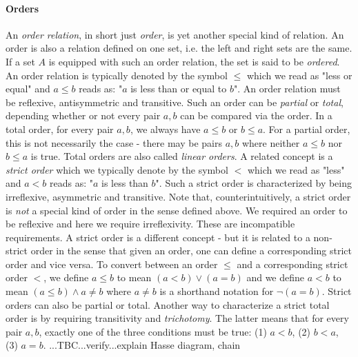 \paragraph{Orders} \label{Par:Orders} An \emph{order relation}, in short just \emph{order}, is yet another special kind of relation. An order is also a relation defined on one set, i.e. the left and right sets are the same. If a set $A$ is equipped with such an order relation, the set is said to be \emph{ordered}. An order relation is typically denoted by the symbol $\leq$ which we read as "less or equal" and $a \leq b$ reads as: "$a$ is less than or equal to $b$". An order relation must be reflexive, antisymmetric and transitive. Such an order can be \emph{partial} or \emph{total}, depending whether or not every pair $a,b$ can be compared via the order. In a total order, for every pair $a,b$, we always have $a \leq b$ or $b \leq a$. For a partial order, this is not necessarily the case - there may be pairs $a,b$ where neither $a \leq b$ nor $b \leq a$ is true. Total orders are also called \emph{linear orders}. A related concept is a \emph{strict order} which we typically denote by the symbol $<$ which we read as "less" and $a < b$ reads as: "$a$ is less than $b$". Such a strict order is characterized by being irreflexive, asymmetric and transitive. Note that, counterintuitively, a strict order is \emph{not} a special kind of order in the sense defined above. We required an order to be reflexive and here we require irreflexivity. These are incompatible requirements. A strict order is a different concept - but it is related to a non-strict order in the sense that given an order, one can define a corresponding strict order and vice versa. To convert between an order $\leq$ and a corresponding strict order $<$, we define $a \leq b$ to mean $(a < b) \vee (a = b)$ and we define $a < b$ to mean $(a \leq b) \wedge a \neq b$ where $a \neq b$ is a shorthand notation for $\neg (a = b)$. Strict orders can also be partial or total. Another way to characterize a strict total order is by requiring transitivity and \emph{trichotomy}. The latter means that for every pair $a,b$, exactly one of the three conditions must be true: (1) $a < b$, (2) $b < a$, (3) $a = b$.
 ...TBC...verify...explain Hasse diagram, chain
 



